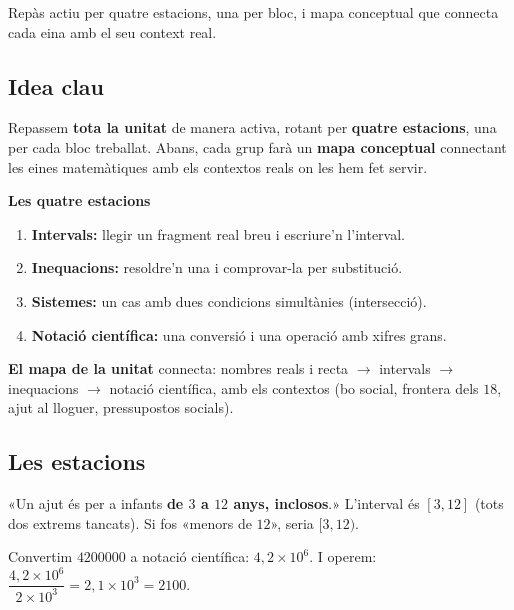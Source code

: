 %
{Repàs actiu per quatre estacions, una per bloc, i mapa conceptual que connecta cada eina amb el seu context real.}

\subsection{Idea clau}

Repassem \textbf{tota la unitat} de manera activa, rotant per \textbf{quatre
estacions}, una per cada bloc treballat. Abans, cada grup farà un \textbf{mapa
conceptual} connectant les eines matemàtiques amb els contextos reals on les hem
fet servir.

\begin{idea}
\textbf{Les quatre estacions}
\begin{enumerate}[leftmargin=1.6em, itemsep=2pt]
  \item \textbf{Intervals:} llegir un fragment real breu i escriure'n l'interval.
  \item \textbf{Inequacions:} resoldre'n una i comprovar-la per substitució.
  \item \textbf{Sistemes:} un cas amb dues condicions simultànies (intersecció).
  \item \textbf{Notació científica:} una conversió i una operació amb xifres grans.
\end{enumerate}
\textbf{El mapa de la unitat} connecta: nombres reals i recta $\rightarrow$ intervals
$\rightarrow$ inequacions $\rightarrow$ notació científica, amb els contextos (bo
social, frontera dels $18$, ajut al lloguer, pressupostos socials).
\end{idea}

\subsection{Les estacions}

\begin{exemple}
«Un ajut és per a infants \textbf{de $3$ a $12$ anys, inclosos}.» L'interval és
$[3,12]$ (tots dos extrems tancats). Si fos «menors de $12$», seria $[3,12)$.
\end{exemple}

\begin{exemple}
Convertim $\num{4200000}$ a notació científica: $4,2\times 10^{6}$. I operem:
$\dfrac{4,2\times 10^{6}}{2\times 10^{3}}=2,1\times 10^{3}=\num{2100}$.
\end{exemple}

